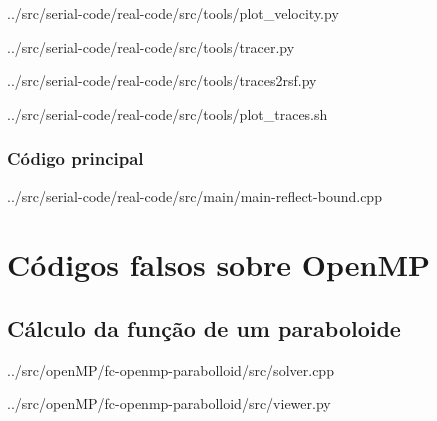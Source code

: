 	     
	     {../src/serial-code/real-code/src/tools/plot_velocity.py}

	     
	     {../src/serial-code/real-code/src/tools/tracer.py}
	     
	     
	     {../src/serial-code/real-code/src/tools/traces2rsf.py}
	     
	     
	     {../src/serial-code/real-code/src/tools/plot_traces.sh}
	
	\subsection{Código principal}
	     
	     {../src/serial-code/real-code/src/main/main-reflect-bound.cpp}
	
\chapter{Códigos falsos sobre OpenMP}
\section{Cálculo da função de um paraboloide}
     
     {../src/openMP/fc-openmp-parabolloid/src/solver.cpp}
     
     
     {../src/openMP/fc-openmp-parabolloid/src/viewer.py}
	
